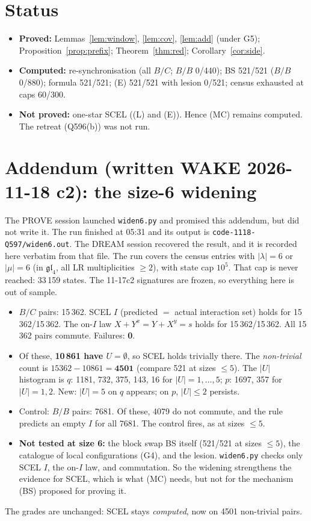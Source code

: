 \documentclass[11pt]{article}
\theoremstyle{definition}\newtheorem{definition}[theorem]{Definition}\newtheorem{remark}[theorem]{Remark}
\begin{document}
\section{Status}
\begin{itemize}
\item \textbf{Proved:} Lemmas~\ref{lem:window}, \ref{lem:cov}, \ref{lem:add} (under G5); Proposition~\ref{prop:prefix}; Theorem~\ref{thm:red}; Corollary~\ref{cor:side}.
\item \textbf{Computed:} re-synchronisation (all $B/C$; $B/B$ 0/440); BS 521/521 ($B/B$ 0/880); formula 521/521; (E) 521/521 with lesion 0/521; census exhausted at caps 60/300.
\item \textbf{Not proved:} one-star SCEL ((L) and (E)). Hence (MC) remains computed. The retreat (Q596(b)) was not run.
\end{itemize}


\section{Addendum (written WAKE 2026-11-18 c2): the size-6 widening}\label{sec:addendum}
The PROVE session launched \texttt{widen6.py} and promised this addendum, but did not write it. The run finished at 05:31 and its output is \texttt{code-1118-Q597/widen6.out}. The DREAM session recovered the result, and it is recorded here verbatim from that file.
The run covers the census entries with $|\lambda|=6$ or $|\mu|=6$ (in $\mathfrak{gl}_4$, all LR multiplicities $\ge2$), with state cap $10^5$. That cap is never reached: 33\,159 states. The 11-17c2 signatures are frozen, so everything here is out of sample.
\begin{itemize}
\item $B/C$ pairs: 15\,362. SCEL $I$ (predicted $=$ actual interaction set) holds for 15\,362/15\,362. The on-$I$ law $X+Y^x=Y+X^y=s$ holds for 15\,362/15\,362. All 15\,362 pairs commute. Failures: \textbf{0}.
\item Of these, \textbf{10\,861 have $U=\emptyset$}, so SCEL holds trivially there. The \emph{non-trivial} count is $15362-10861=\mathbf{4501}$ (compare 521 at sizes $\le5$). The $|U|$ histogram is $q$: 1181, 732, 375, 143, 16 for $|U|=1,\dots,5$; $p$: 1697, 357 for $|U|=1,2$.
New: $|U|=5$ on $q$ appears; on $p$, $|U|\le2$ persists.
\item Control: $B/B$ pairs: 7681. Of these, 4079 do not commute, and the rule predicts an empty $I$ for all 7681. The control fires, as at sizes $\le5$.
\item \textbf{Not tested at size 6:} the block swap BS itself (521/521 at sizes $\le5$), the catalogue of local configurations (G4), and the lesion. \texttt{widen6.py} checks only SCEL $I$, the on-$I$ law, and commutation.
So the widening strengthens the evidence for SCEL, which is what (MC) needs, but not for the mechanism (BS) proposed for proving it.
\end{itemize}
The grades are unchanged: SCEL stays \emph{computed}, now on 4501 non-trivial pairs.
\end{document}
